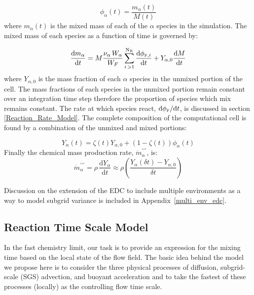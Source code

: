 \begin{equation}\label{eq:phi}
\phi_{\alpha}(t)=\frac{m_{\alpha}(t)}{M(t)}
\end{equation}
where $m_\alpha(t)$ is the mixed mass of each of the $\alpha$ species in the simulation. The mixed mass of each species as a function of time is governed by:

\begin{equation}\label{eq:mixmass}
\frac{\mbox{d}m_{\alpha}}{\mbox{d}t}=M\frac{\nu_{\alpha} \, W_{\alpha}}{W_F}\displaystyle \sum_{i\,>1}^{\mathrm{N_{R}}}\frac{\mbox{d}\phi_{{\tiny \hbox{F}},i}}{\mbox{d}t}+Y_{\alpha,0}\frac{\mbox{d}M}{\mbox{d}t} 
\end{equation}
where $Y_{\alpha,0}$ is the mass fraction of each $\alpha$ species in the unmixed portion of the cell. The mass fractions of each species in the unmixed portion remain constant over an integration time step therefore the proportion of species which mix remains constant. The rate at which species react, $\mbox{d}\phi_{\tiny \hbox{F}}/\mbox{d}t$, is discussed in section \ref{Reaction_Rate_Model}. The complete composition of the computational cell is found by a combination of the unmixed and mixed portions:

\begin{equation}\label{eq:final_comp}
Y_{\alpha}(t)=\zeta(t)Y_{\alpha,0}+(1-\zeta(t))\phi_{\alpha}(t)
\end{equation}
Finally the chemical mass production rate, $\dot{m}^{\prime\prime\prime}_{\alpha}$, is:
\begin{equation}\label{mass_prod_rate}
\dot{m}^{\prime\prime\prime}_{\alpha}=\rho \,\frac{\mbox{d}Y_{\alpha}}{\mbox{d}t} \approx \rho \left(\frac{Y_{\alpha}(\delta t) - Y_{\alpha,0}}{\delta t}\right)
\end{equation}

Discussion on the extension of the EDC to include multiple environments as a way to model subgrid variance is included in Appendix~{\ref{multi_env_edc}}.

\subsection{Reaction Time Scale Model}
\label{sec:reac_time_scale}

In the fast chemistry limit, our task is to provide an expression for the mixing time based on the local state of the flow field.  The basic idea behind the model we propose here is to consider the three physical processes of diffusion, subgrid-scale (SGS) advection, and buoyant acceleration and to take the fastest of these processes (locally) as the controlling flow time scale.

